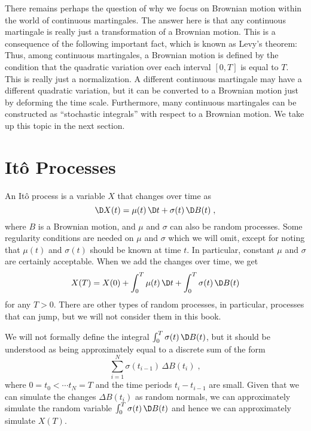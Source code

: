 There remains perhaps the question of why we focus on Brownian motion within the world of continuous martingales.  The answer here is that any continuous martingale is really just a transformation of a Brownian motion.  This is a consequence of the following important fact, which is known as Levy's theorem: 
Thus, among continuous martingales, a Brownian motion is defined by the condition that the quadratic variation over each interval $[0,T]$ is equal to $T$.  This is really just a normalization.  A different continuous martingale may have a different quadratic variation, but it can be converted to a Brownian motion just by deforming the time scale.  Furthermore, many continuous martingales can be constructed as ``stochastic integrals'' with respect to a Brownian motion.  We take up this topic in the next section.

\section{It\^o Processes}\label{s_itoprocesses}
An It\^o process is a variable $X$ that changes over time as 
\begin{equation}\label{itoprocess}
\D X(t) = \mu(t)\,\D t+\sigma(t)\,\D B(t)\;,
\end{equation}
where $B$ is a Brownian motion, and $\mu$ and $\sigma$ can also be random processes.  Some regularity conditions are needed on $\mu$ and $\sigma$ which we will omit, except for noting that $\mu(t)$ and $\sigma(t)$ should be known at time $t$.  In particular, constant $\mu$ and $\sigma$ are certainly acceptable.  When we add the changes over time, we get
$$X(T)=X(0) + \int_0^T\mu(t)\,\D t + \int_0^T\sigma(t)\,\D B(t)$$
for any $T>0$.  There are other types of random processes, in particular, processes that can jump, but we will not consider them in this book.

We will not formally define the integral $\int_0^T \sigma(t)\,\D B(t)$, but it should be understood as being approximately equal to a discrete sum of the form 
$$\sum_{i=1}^N \sigma(t_{i-1})\,\varDelta B(t_i)\; ,$$
where $0=t_0 < \cdots t_N=T$ and the time periods $t_i-t_{i-1}$ are small.  Given that we can simulate the changes $\varDelta B(t_i)$ as random normals, we can approximately simulate the random variable $\int_0^T \sigma(t)\,\D B(t)$ and hence we can approximately simulate $X(T)$.

